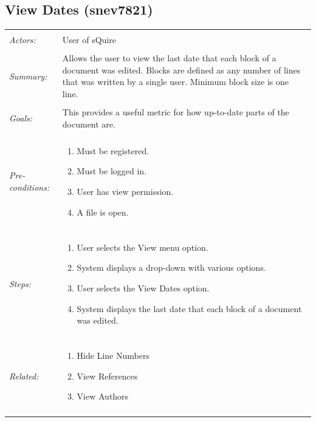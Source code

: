 \documentclass[11pt]{report}
\begin{document}
\subsection{View Dates (snev7821)}
\begin{tabular}{ p{2cm} p{12cm} }
\hline \\
	\textit{Actors:} & User of sQuire \\
	\\
	\textit{Summary:} & Allows the user to view the last date that each block of a document was edited. Blocks are defined as any number of lines that was written by a single user. Minimum block size is one line. \\
	\\
	\textit{Goals:} & This provides a useful metric for how up-to-date parts of the document are. \\
	\\
	\textit{Pre-conditions:} & \begin{enumerate}
		\item Must be registered.
		\item Must be logged in.
		\item User has view permission.
		\item A file is open.
	\end{enumerate} \\
	\\
	\textit{Steps:} & \begin{enumerate}
		\item User selects the View menu option.
		\item System displays a drop-down with various options.
		\item User selects the View Dates option.
		\item System displays the last date that each block of a document was edited.
	\end{enumerate} \\
	\\
	\textit{Related:} & \begin{enumerate}
		\item Hide Line Numbers
		\item View References
		\item View Authors
	\end{enumerate} \\
	\\
\hline
\end{tabular}
\newpage
\end{document}
